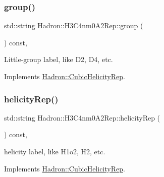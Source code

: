 \mbox{\label{structHadron_1_1H3C4nm0A2Rep_a645f15ec66163ba3a04123eb5456f42d}} 
\subsubsection{\texorpdfstring{group()}{group()}\hspace{0.1cm}{\footnotesize\ttfamily [5/5]}}
{\footnotesize\ttfamily std\+::string Hadron\+::\+H3\+C4nm0\+A2\+Rep\+::group (\begin{DoxyParamCaption}{ }\end{DoxyParamCaption}) const\hspace{0.3cm}{\ttfamily [inline]}, {\ttfamily [virtual]}}

Little-\/group label, like D2, D4, etc. 

Implements \mbox{\hyperlink{structHadron_1_1CubicHelicityRep_a101a7d76cd8ccdad0f272db44b766113}{Hadron\+::\+Cubic\+Helicity\+Rep}}.

\mbox{\label{structHadron_1_1H3C4nm0A2Rep_a14eb635569428c91f83b7019b68ab2b6}} 
\subsubsection{\texorpdfstring{helicityRep()}{helicityRep()}\hspace{0.1cm}{\footnotesize\ttfamily [1/3]}}
{\footnotesize\ttfamily std\+::string Hadron\+::\+H3\+C4nm0\+A2\+Rep\+::helicity\+Rep (\begin{DoxyParamCaption}{ }\end{DoxyParamCaption}) const\hspace{0.3cm}{\ttfamily [inline]}, {\ttfamily [virtual]}}

helicity label, like H1o2, H2, etc. 

Implements \mbox{\hyperlink{structHadron_1_1CubicHelicityRep_af1096946b7470edf0a55451cc662f231}{Hadron\+::\+Cubic\+Helicity\+Rep}}.

\mbox{\label{structHadron_1_1H3C4nm0A2Rep_a14eb635569428c91f83b7019b68ab2b6}} 
